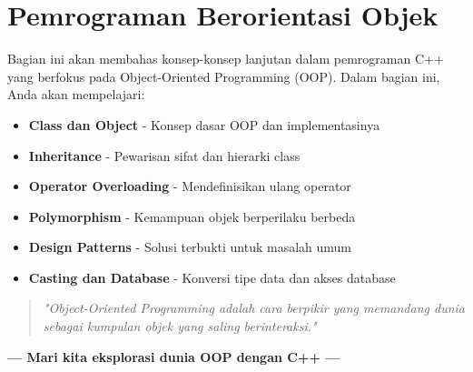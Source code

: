 \section*{Pemrograman Berorientasi Objek}

Bagian ini akan membahas konsep-konsep lanjutan dalam pemrograman C++ yang berfokus pada Object-Oriented Programming (OOP). Dalam bagian ini, Anda akan mempelajari:

\begin{itemize}
\item \textbf{Class dan Object} - Konsep dasar OOP dan implementasinya
\item \textbf{Inheritance} - Pewarisan sifat dan hierarki class
\item \textbf{Operator Overloading} - Mendefinisikan ulang operator
\item \textbf{Polymorphism} - Kemampuan objek berperilaku berbeda
\item \textbf{Design Patterns} - Solusi terbukti untuk masalah umum
\item \textbf{Casting dan Database} - Konversi tipe data dan akses database
\end{itemize}

\begin{quote}
\textit{"Object-Oriented Programming adalah cara berpikir yang memandang dunia sebagai kumpulan objek yang saling berinteraksi."}
\end{quote}

\vspace{1cm}

\begin{center}
\textbf{--- Mari kita eksplorasi dunia OOP dengan C++ ---}
\end{center}